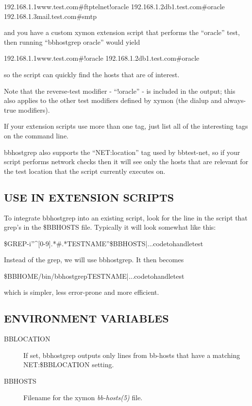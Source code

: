   
192.168.1.1www.test.com\#ftptelnet!oracle  
192.168.1.2db1.test.com\#oracle  
192.168.1.3mail.test.com\#smtp 


  and you have a custom xymon extension script that performs the
  ``oracle'' test, then running ``bbhostgrep oracle'' would yield 



  
192.168.1.1www.test.com\#!oracle  
192.168.1.2db1.test.com\#oracle 


  so the script can quickly find the hosts that are of interest. 


  Note that the reverse-test modifier - ``!oracle'' - is included in
  the output; this also applies to the other test modifiers defined by
  xymon (the dialup and always-true modifiers). 



  If your extension scripts use more than one tag, just list all of
  the interesting tags on the command line. 



  bbhostgrep also supports the ``NET:location'' tag used by
  bbtest-net, so if your script performs network checks then it will
  see only the hosts that are relevant for the test location that the
  script currently executes on. 



 
\subsection{USE IN EXTENSION SCRIPTS}
 To integrate bbhostgrep into an existing script, look for the line in the script that grep's in the \$BBHOSTS file. Typically it will look somewhat like this: 

  
\$GREP-i''\^{}[0-9].*\#.*TESTNAME''\$BBHOSTS|...codetohandletest 


  Instead of the grep, we will use bbhostgrep. It then becomes 


  
\$BBHOME/bin/bbhostgrepTESTNAME|...codetohandletest 


  which is simpler, less error-prone and more efficient. 


 
\subsection{ENVIRONMENT VARIABLES}
\begin{description}
\item[BBLOCATION] If set, bbhostgrep outputs only lines from bb-hosts that have a matching NET:\$BBLOCATION setting. 

 

\item[BBHOSTS] Filename for the xymon \emph{bb-hosts(5)}
 file. 

 


\end{description}
